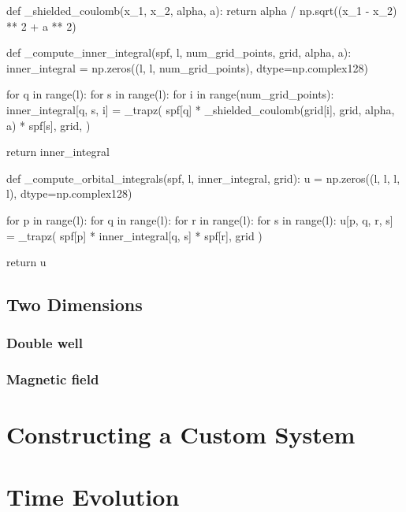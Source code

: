 \begin{python}
def _shielded_coulomb(x_1, x_2, alpha, a):
    return alpha / np.sqrt((x_1 - x_2) ** 2 + a ** 2)
\end{python}

\begin{python}
def _compute_inner_integral(spf, l, num_grid_points, grid, alpha, a):
    inner_integral = np.zeros((l, l, num_grid_points), dtype=np.complex128)

    for q in range(l):
        for s in range(l):
            for i in range(num_grid_points):
                inner_integral[q, s, i] = _trapz(
                    spf[q]
                    * _shielded_coulomb(grid[i], grid, alpha, a)
                    * spf[s],
                    grid,
                )

    return inner_integral
\end{python}

\begin{python}
def _compute_orbital_integrals(spf, l, inner_integral, grid):
    u = np.zeros((l, l, l, l), dtype=np.complex128)

    for p in range(l):
        for q in range(l):
            for r in range(l):
                for s in range(l):
                    u[p, q, r, s] = _trapz(
                        spf[p] * inner_integral[q, s] * spf[r], grid
                    )

    return u
\end{python}



\subsection{Two Dimensions}

\subsubsection{Double well}

\subsubsection{Magnetic field}

\section{Constructing a Custom System}

\section{Time Evolution}

